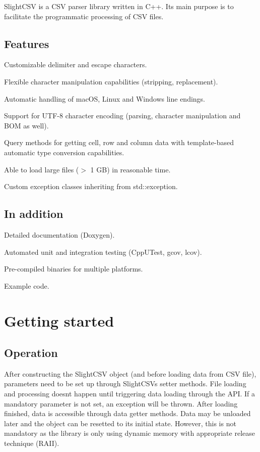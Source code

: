 Slight\+C\+SV is a C\+SV parser library written in C++. Its main purpose is to facilitate the programmatic processing of C\+SV files.

\subsection*{Features}


\begin{DoxyItemize}
\item Customizable delimiter and escape characters.
\item Flexible character manipulation capabilities (stripping, replacement).
\item Automatic handling of mac\+OS, Linux and Windows line endings.
\item Support for U\+T\+F-\/8 character encoding (parsing, character manipulation and B\+OM as well).
\item Query methods for getting cell, row and column data with template-\/based automatic type conversion capabilities.
\item Able to load large files ($>$ 1 GB) in reasonable time.
\item Custom exception classes inheriting from std\+::exception.
\end{DoxyItemize}

\subsection*{In addition}


\begin{DoxyItemize}
\item Detailed documentation (Doxygen).
\item Automated unit and integration testing (Cpp\+U\+Test, gcov, lcov).
\item Pre-\/compiled binaries for multiple platforms.
\item Example code.
\end{DoxyItemize}

\section*{Getting started}

\subsection*{Operation}

After constructing the Slight\+C\+SV object (and before loading data from C\+SV file), parameters need to be set up through Slight\+C\+SV\textquotesingle{}s setter methods. File loading and processing doesn\textquotesingle{}t happen until triggering data loading through the A\+PI. If a mandatory parameter is not set, an exception will be thrown. After loading finished, data is accessible through data getter methods. Data may be unloaded later and the object can be resetted to its initial state. However, this is not mandatory as the library is only using dynamic memory with appropriate release technique (R\+A\+II).

